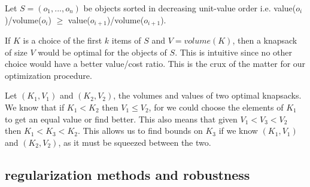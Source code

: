 \documentclass{article} %
\begin{document}
Let $S = (o_1 , ..., o_n)$ be objects sorted in decreasing unit-value order i.e. value($o_i$)/volume($o_i$) $\geq$  value($o_{i+1}$)/volume($o_{i+1}$).

If $K$ is a choice of the first $k$ items of $S$ and $V=volume(K)$, then a knapsack of size $V$ would be optimal for the objects of $S$. This is intuitive since no other choice would have a better value/cost ratio. This is the crux of the matter for our optimization procedure.


Let $(K_1, V_1)$ and $(K_2, V_2)$, the volumes and values of two optimal knapsacks. We know that if $K_1 < K_2$ then $V_1 \leq V_2$, for we could choose the elements of $K_1$ to get an equal value or find better. This also means that given $V_1 < V_3 < V_2$ then $K_1 < K_3 < K_2$. This allows us to find bounds on $K_3$ if we know $(K_1, V_1)$ and $(K_2, V_2)$, as it must be squeezed between the two.

%
%
%
%
%
%

\newpage
\subsection{regularization methods and robustness}
\end{document}
